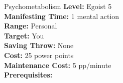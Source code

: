 {Psychometabolism}
{
	\textbf{Level:}
	Egoist 5\\
	\textbf{Manifesting Time:}
	1 mental action\\
	\textbf{Range:}
	Personal\\
	\textbf{Target:}
	You\\
	\textbf{Saving Throw:}
	None\\
	\textbf{Cost:}
	25 power points\\
	\textbf{Maintenance Cost:}
	5 pp/minute\\
	\textbf{Prerequisites:}
	\\
}
